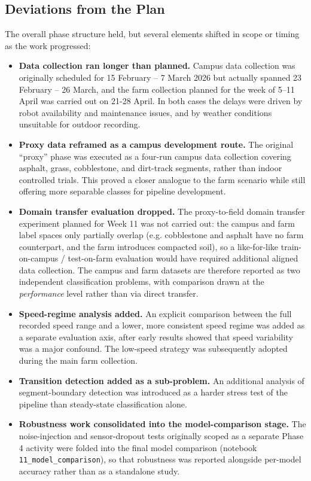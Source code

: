 \subsection{Deviations from the Plan}

The overall phase structure held, but several elements shifted in scope or
timing as the work progressed:

\begin{itemize}
    \item \textbf{Data collection ran longer than planned.} Campus data
          collection was originally scheduled for 15 February – 7 March 2026
          but actually spanned 23 February – 26 March, and the farm collection
          planned for the week of 5–11 April was carried out on 21-28 April.
          In both cases the delays were driven by robot availability and
          maintenance issues, and by weather conditions unsuitable for outdoor
          recording.
    \item \textbf{Proxy data reframed as a campus development route.} The
          original ``proxy'' phase was executed as a four-run campus data
          collection covering asphalt, grass, cobblestone, and dirt-track
          segments, rather than indoor controlled trials. This proved a closer
          analogue to the farm scenario while still offering more separable
          classes for pipeline development.
    \item \textbf{Domain transfer evaluation dropped.} The proxy-to-field
          domain transfer experiment planned for Week 11 was not carried out:
          the campus and farm label spaces only partially overlap (e.g.
          cobblestone and asphalt have no farm counterpart, and the farm
          introduces compacted soil), so a like-for-like train-on-campus /
          test-on-farm evaluation would have required additional aligned data
          collection. The campus and farm datasets are therefore reported as
          two independent classification problems, with comparison drawn at
          the \emph{performance} level rather than via direct transfer.
    \item \textbf{Speed-regime analysis added.} An explicit comparison between
          the full recorded speed range and a lower, more consistent speed
          regime was added as a separate evaluation axis, after early results
          showed that speed variability was a major confound. The low-speed
          strategy was subsequently adopted during the main farm collection.
    \item \textbf{Transition detection added as a sub-problem.} An additional
          analysis of segment-boundary detection was introduced as a harder
          stress test of the pipeline than steady-state classification alone.
    \item \textbf{Robustness work consolidated into the model-comparison
          stage.} The noise-injection and sensor-dropout tests originally
          scoped as a separate Phase 4 activity were folded into the final
          model comparison (notebook \texttt{11\_model\_comparison}), so that
          robustness was reported alongside per-model accuracy rather than
          as a standalone study.
\end{itemize}

